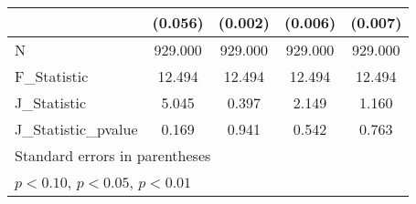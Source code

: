 {\begin{tabular}{l*{4}{c}}
            &     (0.056)         &     (0.002)         &     (0.006)         &     (0.007)         \\
\hline
N           &     929.000         &     929.000         &     929.000         &     929.000         \\
F\_Statistic &      12.494         &      12.494         &      12.494         &      12.494         \\
J\_Statistic &       5.045         &       0.397         &       2.149         &       1.160         \\
J\_Statistic\_pvalue&       0.169         &       0.941         &       0.542         &       0.763         \\
\hline\hline
\multicolumn{5}{l}{\footnotesize Standard errors in parentheses}\\
\multicolumn{5}{l}{\footnotesize \sym{*} \(p<0.10\), \sym{**} \(p<0.05\), \sym{***} \(p<0.01\)}\\
\end{tabular}
}
